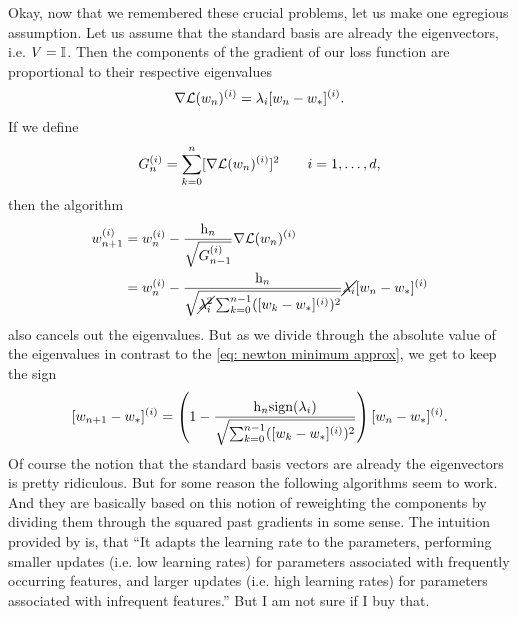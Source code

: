 Okay, now that we remembered these crucial problems, let us make one egregious
assumption. Let us assume that the standard basis are already the eigenvectors,
i.e. \(V=\mathbb{I}\). Then the components of the gradient of our loss function
are proportional to their respective eigenvalues
\begin{align*}
	\nabla\mathcal{L}(w_n)^{(i)}
	= \lambda_i [w_n - w_*]^{(i)}.
\end{align*}
If we define
\begin{align*}
	G_n^{(i)} = \sum_{k=0}^n [\nabla\mathcal{L}(w_n)^{(i)}]^2 \qquad i=1,\dots,d,
\end{align*}
then the algorithm
\begin{align}
	\label{eq: almost adagrad}
	w_{n+1}^{(i)}
	&= w_n^{(i)} - \frac{\text{h}_n}{\sqrt{G_{n-1}^{(i)}}}\nabla\mathcal{L}(w_n)^{(i)}\\
	\nonumber
	&= w_n^{(i)} - \frac{\text{h}_n}{
		\sqrt{\cancel{\lambda_i^2}\sum_{k=0}^{n-1}([w_k - w_*]^{(i)})^2}
	}
	\cancel{\lambda_i}[w_n - w_*]^{(i)}
\end{align}
also cancels out the eigenvalues. But as we divide through the absolute value of
the eigenvalues in contrast to the \ref{eq: newton minimum approx}, we get to
keep the sign
\begin{align}\label{eq: adagrad motivation contraction}
	[w_{n+1}-w_*]^{(i)} = \left(1-\frac{\text{h}_n\text{sign}(\lambda_i)}{
			\sqrt{\sum_{k=0}^{n-1}([w_k - w_*]^{(i)})^2}
		}\right)[w_n - w_*]^{(i)}.
\end{align}
Of course the notion that the standard basis vectors are already the eigenvectors
is pretty ridiculous. But for some reason the following algorithms seem to
work. And they are basically based on this notion of reweighting the components
by dividing them through the squared past gradients in some sense. The intuition
provided by \textcite{ruderOverviewGradientDescent2017} is, that
``It adapts the learning rate to the parameters, performing smaller updates
(i.e. low learning rates) for parameters associated with frequently occurring
features, and larger updates (i.e. high learning rates) for parameters
associated with infrequent features.''
But I am not sure if I buy that.


